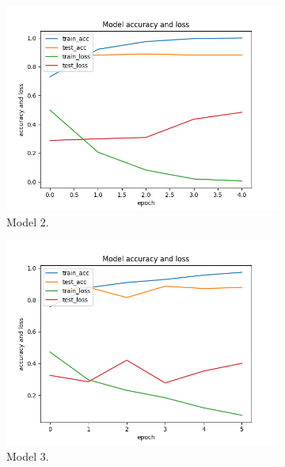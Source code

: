 \documentclass[11pt]{article}
\begin{document}
\begin{figure}[h!]
\begin{subfigure}{0.32\textwidth}
\end{subfigure}
\hfill
\begin{subfigure}{0.32\textwidth}
         \centering
         \includegraphics[width=\textwidth]{model2.png}
         \caption{Model 2.}
         \label{fig:model2}
\end{subfigure}
%
\begin{subfigure}{0.32\textwidth}
         \centering
         \includegraphics[width=\textwidth]{model3.png}
         \caption{Model 3.}
         \label{fig:model3}
\end{subfigure}
\hfill
\begin{subfigure}{0.32\textwidth}
         \centering

\end{subfigure}
\end{figure}
\end{document}
